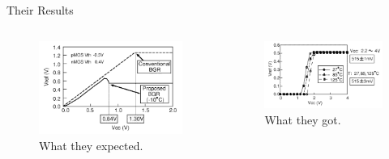 \documentclass[aspectratio=1610]{beamer} %
\begin{document}
\normalsize

\begin{frame}{Their Results}{}

    \begin{columns}[c]
        \begin{figure}
            \includegraphics[height=0.6\columnwidth]{banba_fig_3.png}
            \caption{What they expected.}\label{fig:banba_expected}
        \end{figure}
    
        \begin{figure}
            \includegraphics[height=0.55\columnwidth]{banba_fig_7.png}
            \caption{What they got.}\label{fig:banba_measured}
        \end{figure}
    \end{columns}
    \end{frame}
\end{document}

